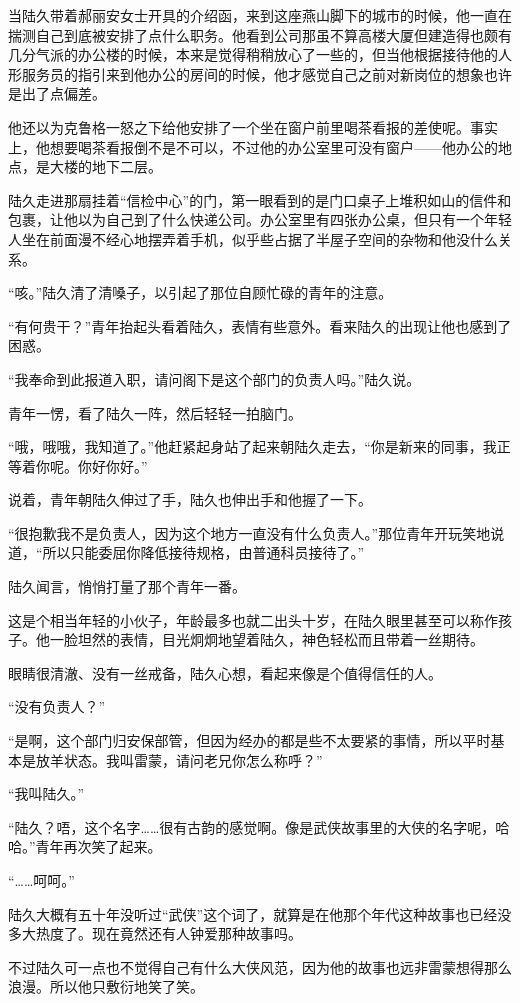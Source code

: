 当陆久带着郝丽安女士开具的介绍函，来到这座燕山脚下的城市的时候，他一直在揣测自己到底被安排了点什么职务。他看到公司那虽不算高楼大厦但建造得也颇有几分气派的办公楼的时候，本来是觉得稍稍放心了一些的，但当他根据接待他的人形服务员的指引来到他办公的房间的时候，他才感觉自己之前对新岗位的想象也许是出了点偏差。

他还以为克鲁格一怒之下给他安排了一个坐在窗户前里喝茶看报的差使呢。事实上，他想要喝茶看报倒不是不可以，不过他的办公室里可没有窗户——他办公的地点，是大楼的地下二层。

陆久走进那扇挂着“信检中心”的门，第一眼看到的是门口桌子上堆积如山的信件和包裹，让他以为自己到了什么快递公司。办公室里有四张办公桌，但只有一个年轻人坐在前面漫不经心地摆弄着手机，似乎些占据了半屋子空间的杂物和他没什么关系。

“咳。”陆久清了清嗓子，以引起了那位自顾忙碌的青年的注意。

“有何贵干？”青年抬起头看着陆久，表情有些意外。看来陆久的出现让他也感到了困惑。

“我奉命到此报道入职，请问阁下是这个部门的负责人吗。”陆久说。

青年一愣，看了陆久一阵，然后轻轻一拍脑门。

“哦，哦哦，我知道了。”他赶紧起身站了起来朝陆久走去，“你是新来的同事，我正等着你呢。你好你好。”

说着，青年朝陆久伸过了手，陆久也伸出手和他握了一下。

“很抱歉我不是负责人，因为这个地方一直没有什么负责人。”那位青年开玩笑地说道，“所以只能委屈你降低接待规格，由普通科员接待了。”

陆久闻言，悄悄打量了那个青年一番。

这是个相当年轻的小伙子，年龄最多也就二出头十岁，在陆久眼里甚至可以称作孩子。他一脸坦然的表情，目光炯炯地望着陆久，神色轻松而且带着一丝期待。

眼睛很清澈、没有一丝戒备，陆久心想，看起来像是个值得信任的人。

“没有负责人？”

“是啊，这个部门归安保部管，但因为经办的都是些不太要紧的事情，所以平时基本是放羊状态。我叫雷蒙，请问老兄你怎么称呼？”

“我叫陆久。”

“陆久？唔，这个名字……很有古韵的感觉啊。像是武侠故事里的大侠的名字呢，哈哈。”青年再次笑了起来。

“……呵呵。”

陆久大概有五十年没听过“武侠”这个词了，就算是在他那个年代这种故事也已经没多大热度了。现在竟然还有人钟爱那种故事吗。

不过陆久可一点也不觉得自己有什么大侠风范，因为他的故事也远非雷蒙想得那么浪漫。所以他只敷衍地笑了笑。

